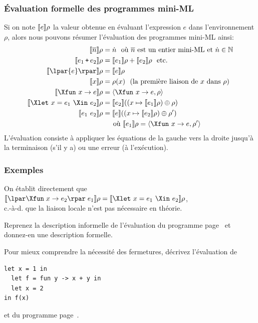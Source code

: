 %
\begin{frame}
\frametitle{Évaluation formelle des programmes mini-ML}

Si on note $\llbracket{e}\rrbracket{\rho}$ la valeur obtenue en évaluant
l'expression $e$ dans l'environnement $\rho$, alors nous pouvons
résumer l'évaluation des programmes mini-ML ainsi:
\begin{align*}
\evalf{\overline{n}}{\rho} &= \dot{n} \ \ \textnormal{où $\overline{n}$
  est un entier mini-ML et $\dot{n} \in \mathbb{N}$}\\
\evalf{e_1 \, \texttt{+} \, e_2}{\rho} &= \evalf{e_1}{\rho} +
\evalf{e_2}{\rho} \ \ \textnormal{etc.}\\
\evalf{\lpar{e}\rpar}{\rho} &= \evalf{e}{\rho}\\
\evalf{x}{\rho} &= \rho(x) \ \ \textnormal{(la première liaison de $x$ dans $\rho$)}\\
\evalf{\Xfun \,\, x \rightarrow e}{\rho} &= \langle\Xfun \,\, x
\rightarrow e, \rho\rangle\\
\evalf{\Xlet \,\, x = e_1 \,\, \Xin \,\, e_2}{\rho} &= \evalf{e_2}{((x
  \mapsto \evalf{e_1}{\rho}) \oplus \rho)}\\
\evalf{e_1 \,\, e_2}{\rho} &= \evalf{e}{((x \mapsto \evalf{e_2}{\rho})
  \oplus \rho')}\\
&\phantom{=\llbracket} \textnormal{où} \ \evalf{e_1}{\rho} = \langle\Xfun \,\, x
\rightarrow e,\rho'\rangle
\end{align*}
L'évaluation consiste à appliquer les équations de la gauche vers la
droite jusqu'à la terminaison (s'il y a) ou une erreur (à
l'exécution).

\end{frame}

%
\begin{frame}[containsverbatim]
\frametitle{Exemples}

On établit directement que $\evalf{\lpar\Xfun \; x \rightarrow
e_2\rpar \; e_1}{\rho} = \evalf{\Xlet \,\, x = e_1 \,\, \Xin \,\,
e_2}{\rho}$,\\ c.-à-d. que la liaison locale n'est pas nécessaire en
théorie.

\bigskip

Reprenez la description informelle de l'évaluation du programme
page~\pageref{exemple_eval_informelle} et donnez-en une description
formelle.

\bigskip

Pour mieux comprendre la nécessité des fermetures, décrivez
l'évaluation de
{\small
\begin{verbatim}
let x = 1 in
  let f = fun y -> x + y in
  let x = 2
in f(x)
\end{verbatim}
}
et du programme page~\pageref{un_autre_programme}.

\end{frame}

